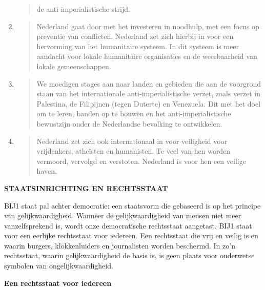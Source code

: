 \begin{enumerate}
\begin{quote}
  de anti-imperialistische strijd.
  \end{quote}
\item
  \begin{quote}
  Nederland gaat door met het investeren in noodhulp, met een focus op
  preventie van conflicten. Nederland zet zich hierbij in voor een
  hervorming van het humanitaire systeem. In dit systeem is meer
  aandacht voor lokale humanitaire organisaties en de weerbaarheid van
  lokale gemeenschappen.
  \end{quote}
\item
  \begin{quote}
  We moedigen stages aan naar landen en gebieden die aan de voorgrond
  staan van het internationale anti-imperialistische verzet, zoals
  verzet in Palestina, de Filipijnen (tegen Duterte) en Venezuela. Dit
  met het doel om te leren, banden op te bouwen en het
  anti-imperialistische bewustzijn onder de Nederlandse bevolking te
  ontwikkelen.
  \end{quote}
\item
  \begin{quote}
  Nederland zet zich ook internationaal in voor veiligheid voor
  vrijdenkers, atheïsten en humanisten. Te veel van hen worden vermoord,
  vervolgd en verstoten. Nederland is voor hen een veilige haven.
  \end{quote}
\end{enumerate}

\textbf{STAATSINRICHTING EN RECHTSSTAAT}

BIJ1 staat pal achter democratie: een staatsvorm die gebaseerd is op het
principe van gelijkwaardigheid. Wanneer de gelijkwaardigheid van mensen
niet meer vanzelfsprekend is, wordt onze democratische rechtsstaat
aangetast. BIJ1 staat voor een eerlijke rechtsstaat voor iedereen. Een
rechtsstaat die vrij en veilig is en waarin burgers, klokkenluiders en
journalisten worden beschermd. In zo'n rechtsstaat, waarin
gelijkwaardigheid de basis is, is geen plaats voor ouderwetse symbolen
van ongelijkwaardigheid.

\textbf{Een rechtsstaat voor iedereen}

